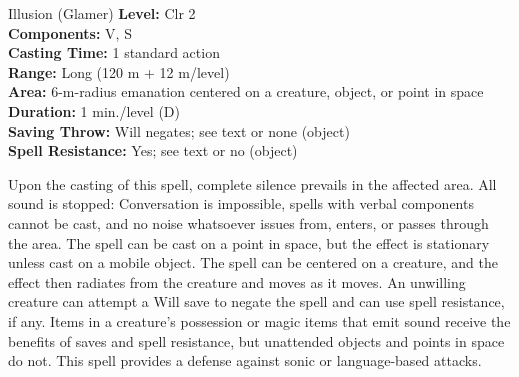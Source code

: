 {Illusion (Glamer)}
{
	\textbf{Level:}
	Clr 2\\
	\textbf{Components:}
	V, S\\
	\textbf{Casting Time:}
	1 standard action\\
	\textbf{Range:}
	Long (120 m + 12 m/level)\\
	\textbf{Area:}
	6-m-radius emanation centered on a creature, object, or point in space\\
	\textbf{Duration:}
	1 min./level (D)\\
	\textbf{Saving Throw:}
	Will negates; see text or none (object)\\
	\textbf{Spell Resistance:}
	Yes; see text or no (object)\\
}
{
	Upon the casting of this spell, complete silence prevails in the affected area. All sound is stopped: Conversation is impossible, spells with verbal components cannot be cast, and no noise whatsoever issues from, enters, or passes through the area. The spell can be cast on a point in space, but the effect is stationary unless cast on a mobile object. The spell can be centered on a creature, and the effect then radiates from the creature and moves as it moves. An unwilling creature can attempt a Will save to negate the spell and can use spell resistance, if any. Items in a creature's possession or magic items that emit sound receive the benefits of saves and spell resistance, but unattended objects and points in space do not. This spell provides a defense against sonic or language-based attacks.

}
